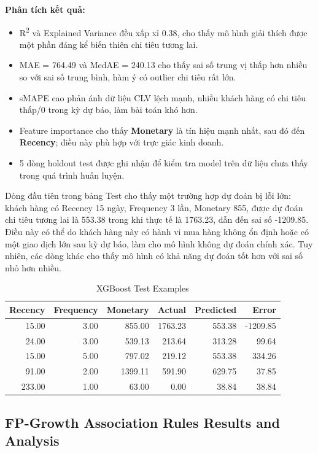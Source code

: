 \documentclass[a4paper,12pt]{article}
\begin{document}
\textbf{Phân tích kết quả:}
\begin{itemize}
    \item R\textsuperscript{2} và Explained Variance đều xấp xỉ 0.38, cho thấy mô hình giải thích được một phần đáng kể biến thiên chi tiêu tương lai.
    \item MAE = 764.49 và MedAE = 240.13 cho thấy sai số trung vị thấp hơn nhiều so với sai số trung bình, hàm ý có outlier chi tiêu rất lớn.
    \item sMAPE cao phản ánh dữ liệu CLV lệch mạnh, nhiều khách hàng có chi tiêu thấp/0 trong kỳ dự báo, làm bài toán khó hơn.
    \item Feature importance cho thấy \textbf{Monetary} là tín hiệu mạnh nhất, sau đó đến \textbf{Recency}; điều này phù hợp với trực giác kinh doanh.
    \item 5 dòng holdout test được ghi nhận để kiểm tra model trên dữ liệu chưa thấy trong quá trình huấn luyện.
\end{itemize}

Dòng đầu tiên trong bảng Test cho thấy một trường hợp dự đoán bị lỗi lớn: khách hàng có Recency 15 ngày, Frequency 3 lần, Monetary 855, được dự đoán chi tiêu tương lai là 553.38 trong khi thực tế là 1763.23, dẫn đến sai số -1209.85. Điều này có thể do khách hàng này có hành vi mua hàng không ổn định hoặc có một giao dịch lớn sau kỳ dự báo, làm cho mô hình không dự đoán chính xác. Tuy nhiên, các dòng khác cho thấy mô hình có khả năng dự đoán tốt hơn với sai số nhỏ hơn nhiều.

\begin{table}[H]
\centering
\caption{XGBoost Test Examples}
\smallskip
\begin{tabular}{rrrrrr}
\toprule
\textbf{Recency} & \textbf{Frequency} & \textbf{Monetary} & \textbf{Actual} & \textbf{Predicted} & \textbf{Error} \\
\midrule
15.00 & 3.00 & 855.00 & 1763.23 & 553.38 & -1209.85 \\
24.00 & 3.00 & 539.13 & 213.64 & 313.28 & 99.64 \\
15.00 & 5.00 & 797.02 & 219.12 & 553.38 & 334.26 \\
91.00 & 2.00 & 1399.11 & 591.90 & 629.75 & 37.85 \\
233.00 & 1.00 & 63.00 & 0.00 & 38.84 & 38.84 \\
\bottomrule
\end{tabular}
\end{table}

\subsection{FP-Growth Association Rules Results and Analysis}
\end{document}
